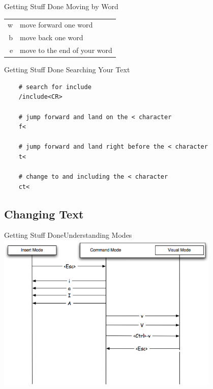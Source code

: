 \documentclass{beamer}
\begin{document}
\begin{frame}[c]{Getting Stuff Done} {Moving by Word} 
    \begin{table}[htpb]
        \centering
        \begin{tabular}{r|l}
            w & move forward one word \\
            b & move back one word \\
            e & move to the end of your word \\
        \end{tabular}
    \end{table}
\end{frame}


\begin{frame}[fragile]{Getting Stuff Done} {Searching Your Text} 
    \begin{lstlisting}
    # search for include
    /include<CR>

    # jump forward and land on the < character
    f<

    # jump forward and land right before the < character
    t<

    # change to and including the < character
    ct<
    \end{lstlisting}  
\end{frame}


\subsection{Changing Text}
\begin{frame}[c]{Getting Stuff Done}{Understanding Modes}
    \centering
    \includegraphics[width=0.8\textwidth]{modes}
\end{frame}
\end{document}
